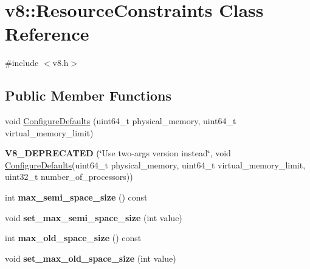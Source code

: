 \hypertarget{classv8_1_1_resource_constraints}{}\section{v8\+:\+:Resource\+Constraints Class Reference}
\label{classv8_1_1_resource_constraints}


{\ttfamily \#include $<$v8.\+h$>$}

\subsection*{Public Member Functions}
\begin{DoxyCompactItemize}
\item 
void \hyperlink{classv8_1_1_resource_constraints_aeeaaee4017e8d5f8f0439af2af2ed3a5}{Configure\+Defaults} (uint64\+\_\+t physical\+\_\+memory, uint64\+\_\+t virtual\+\_\+memory\+\_\+limit)
\item 
\hypertarget{classv8_1_1_resource_constraints_a9cdff07ac0633cd33eddd4e58cbfa3a9}{}{\bfseries V8\+\_\+\+D\+E\+P\+R\+E\+C\+A\+T\+E\+D} (\char`\"{}Use two-\/args version instead\char`\"{}, void \hyperlink{classv8_1_1_resource_constraints_aeeaaee4017e8d5f8f0439af2af2ed3a5}{Configure\+Defaults}(uint64\+\_\+t physical\+\_\+memory, uint64\+\_\+t virtual\+\_\+memory\+\_\+limit, uint32\+\_\+t number\+\_\+of\+\_\+processors))\label{classv8_1_1_resource_constraints_a9cdff07ac0633cd33eddd4e58cbfa3a9}

\item 
\hypertarget{classv8_1_1_resource_constraints_aeeecbbdb2c7880bf74d5d7fb9bbc52b3}{}int {\bfseries max\+\_\+semi\+\_\+space\+\_\+size} () const \label{classv8_1_1_resource_constraints_aeeecbbdb2c7880bf74d5d7fb9bbc52b3}

\item 
\hypertarget{classv8_1_1_resource_constraints_ac83efbf72458c872009f66019352409e}{}void {\bfseries set\+\_\+max\+\_\+semi\+\_\+space\+\_\+size} (int value)\label{classv8_1_1_resource_constraints_ac83efbf72458c872009f66019352409e}

\item 
\hypertarget{classv8_1_1_resource_constraints_a72840efdbcfc7bb287c6aea38d0b07b9}{}int {\bfseries max\+\_\+old\+\_\+space\+\_\+size} () const \label{classv8_1_1_resource_constraints_a72840efdbcfc7bb287c6aea38d0b07b9}

\item 
\hypertarget{classv8_1_1_resource_constraints_aa764be7c76b4baa3fce7a54c3777b5e9}{}void {\bfseries set\+\_\+max\+\_\+old\+\_\+space\+\_\+size} (int value)\label{classv8_1_1_resource_constraints_aa764be7c76b4baa3fce7a54c3777b5e9}


\end{DoxyCompactItemize}
